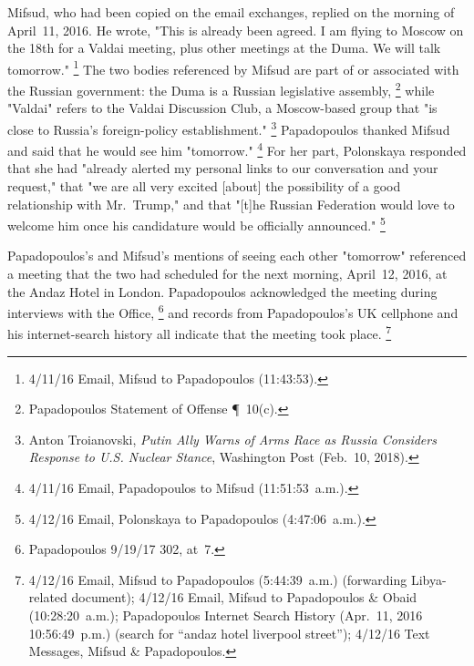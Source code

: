 Mifsud, who had been copied on the email exchanges, replied on the morning of April~11, 2016.
He wrote, "This is already been agreed.
I am flying to Moscow on the 18th for a Valdai meeting, plus other meetings at the Duma.
We will talk tomorrow."%
\footnote{4/11/16 Email, Mifsud to Papadopoulos (11:43:53).}
The two bodies referenced by Mifsud are part of or associated with the Russian government: the Duma is a Russian legislative assembly,%
\footnote{Papadopoulos Statement of Offense \P~10(c).}
while "Valdai" refers to the Valdai Discussion Club, a Moscow-based group that "is close to Russia's foreign-policy establishment."%
\footnote{Anton Troianovski, \textit{Putin Ally Warns of Arms Race as Russia Considers Response to U.S. Nuclear Stance}, Washington Post (Feb.~10, 2018).}
Papadopoulos thanked Mifsud and said that he would see him "tomorrow."%
\footnote{4/11/16 Email, Papadopoulos to Mifsud (11:51:53~a.m.).}
For her part, Polonskaya responded that she had "already alerted my personal links to our conversation and your request," that "we are all very excited [about] the possibility of a good relationship with Mr.~Trump," and that "[t]he Russian Federation would love to welcome him once his candidature would be officially announced."%
\footnote{4/12/16 Email, Polonskaya to Papadopoulos (4:47:06~a.m.).}

Papadopoulos's and Mifsud's mentions of seeing each other "tomorrow" referenced a meeting that the two had scheduled for the next morning, April~12, 2016, at the Andaz Hotel in London.
Papadopoulos acknowledged the meeting during interviews with the Office,%
\footnote{Papadopoulos 9/19/17 302, at~7.}
and records from Papadopoulos's UK cellphone and his internet-search history all indicate that the meeting took place.%
\footnote{4/12/16 Email, Mifsud to Papadopoulos (5:44:39~a.m.) (forwarding Libya-related document); 4/12/16 Email, Mifsud to Papadopoulos \& Obaid (10:28:20~a.m.); Papadopoulos Internet Search History (Apr.~11, 2016 10:56:49~p.m.) (search for ``andaz hotel liverpool street''); 4/12/16 Text Messages, Mifsud \& Papadopoulos.}


